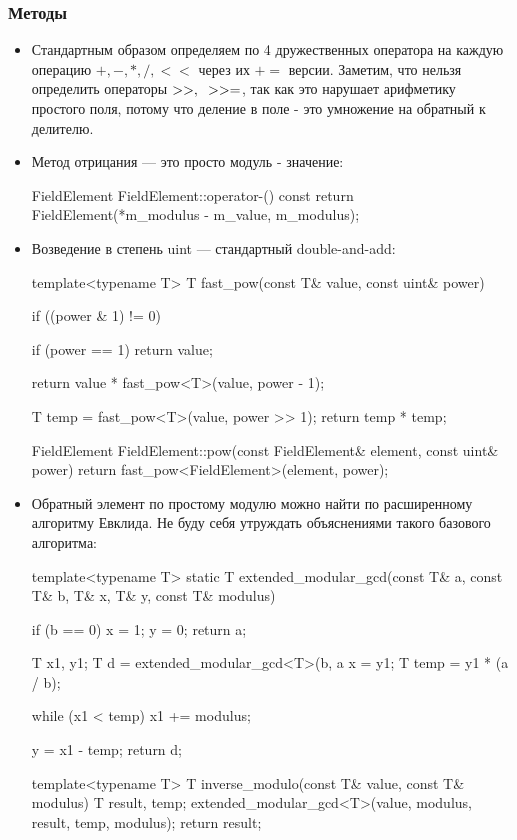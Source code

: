 \subsubsection{Методы}
\begin{itemize}
  \item Стандартным образом определяем по 4 дружественных оператора на каждую операцию $+,-,*,/,<<$ через их $+=$ версии. Заметим, что нельзя определить операторы $>>,\hspace{0.2cm} >>=$, так как это нарушает арифметику простого поля, потому что деление в поле - это умножение на обратный к делителю.

  \item Метод отрицания --- это просто модуль - значение:
  \begin{cppcode}
FieldElement FieldElement::operator-() const {
    return FieldElement(*m_modulus - m_value, m_modulus);
}
  \end{cppcode}
  \item   Возведение в степень uint --- стандартный double-and-add:
  \begin{cppcode}
template<typename T>
T fast_pow(const T& value, const uint& power) {
    if ((power & 1) != 0) {
        if (power == 1) {
            return value;
        }

        return value * fast_pow<T>(value, power - 1);
    }

    T temp = fast_pow<T>(value, power >> 1);
    return temp * temp;
}

FieldElement FieldElement::pow(const FieldElement& element, const uint& power) {
    return fast_pow<FieldElement>(element, power);
}
  \end{cppcode}

  \item Обратный элемент по простому модулю можно найти по расширенному алгоритму Евклида. Не буду себя утруждать объяснениями такого базового алгоритма:
  \begin{cppcode}
template<typename T>
static T extended_modular_gcd(const T& a, const T& b, T& x, T& y, const T& modulus) {
    if (b == 0) {
        x = 1;
        y = 0;
        return a;
    }

    T x1, y1;
    T d = extended_modular_gcd<T>(b, a %
    x = y1;
    T temp = y1 * (a / b);

    while (x1 < temp) {
        x1 += modulus;
    }

    y = x1 - temp;
    return d;
}

template<typename T>
T inverse_modulo(const T& value, const T& modulus) {
    T result, temp;
    extended_modular_gcd<T>(value, modulus, result, temp, modulus);
    return result;
}


\end{cppcode}
\end{itemize}
